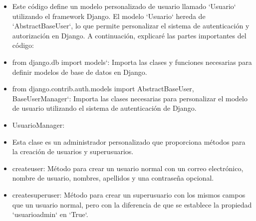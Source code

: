 \documentclass{article}
\begin{document}
        \begin{itemize}
        \item  Este código define un modelo personalizado de usuario llamado `Usuario` utilizando el framework Django. El modelo `Usuario` hereda de `AbstractBaseUser`, lo que permite personalizar el sistema de autenticación y autorización en Django. A continuación, explicaré las partes importantes del código:
        \item from django.db import models`: Importa las clases y funciones necesarias para definir modelos de base de datos en Django.
        \item from django.contrib.auth.models import AbstractBaseUser, BaseUserManager`: Importa las clases necesarias para personalizar el modelo de usuario utilizando el sistema de autenticación de Django.

        \item UsuarioManager:
        \item Esta clase es un administrador personalizado que proporciona métodos para la creación de usuarios y superusuarios.
        \item createuser: Método para crear un usuario normal con un correo electrónico, nombre de usuario, nombres, apellidos y una contraseña opcional.
        \item createsuperuser: Método para crear un superusuario con los mismos campos que un usuario normal, pero con la diferencia de que se establece la propiedad `usuarioadmin` en `True`.


\end{itemize}
\end{document}
